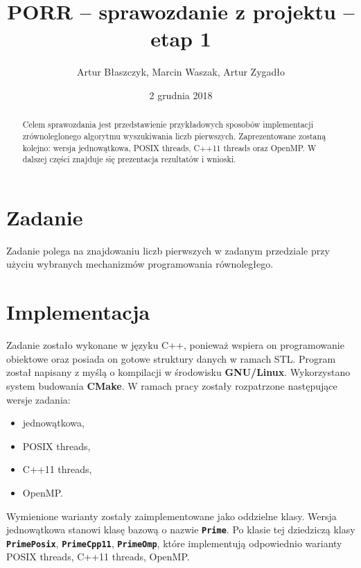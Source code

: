 \documentclass[12pt, twoside, hidelinks, a4paper]{article}
\begin{document}

\author{Artur Błaszczyk, Marcin Waszak, Artur Zygadło}
\title{PORR -- sprawozdanie z projektu -- etap 1}
\date{2 grudnia 2018}


\maketitle

\begin{abstract}
Celem sprawozdania jest przedstawienie przykładowych sposobów implementacji zrównoleglonego algorytmu wyszukiwania liczb pierwszych. Zaprezentowane zostaną kolejno: wersja jednowątkowa, POSIX threads, C++11 threads oraz OpenMP. W dalszej części znajduje się prezentacja rezultatów i wnioski. 
\end{abstract}

\section{Zadanie}
Zadanie polega na znajdowaniu liczb pierwszych w zadanym przedziale przy użyciu wybranych mechanizmów programowania równoległego.

\section{Implementacja}
Zadanie zostało wykonane w języku C++, ponieważ wspiera on programowanie obiektowe oraz posiada on gotowe struktury danych w ramach STL. Program został napisany z myślą o kompilacji w środowisku \textbf{GNU/Linux}. Wykorzystano system budowania \textbf{CMake}. W ramach pracy zostały rozpatrzone następujące wersje zadania:
\begin{itemize}
\item jednowątkowa,
\item POSIX threads,
\item C++11 threads,
\item OpenMP.
\end{itemize}

Wymienione warianty zostały zaimplementowane jako oddzielne klasy. Wersja jednowątkowa stanowi klasę bazową o nazwie \textbf{\texttt{Prime}}. Po klasie tej dziedziczą klasy \textbf{\texttt{PrimePosix}}, \textbf{\texttt{PrimeCpp11}}, \textbf{\texttt{PrimeOmp}}, które implementują odpowiednio warianty POSIX threads, C++11 threads, OpenMP.
\end{document}
